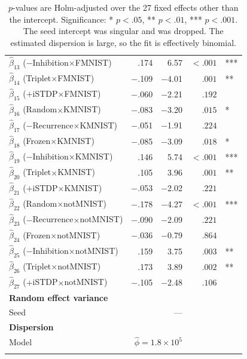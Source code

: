 {\begin{longtable}{lrrrl}
    $\hat{\beta}_{13}$ ($-$Inhibition$\times$FMNIST) & .174 & 6.57 & $<.001$ & ***\\
    $\hat{\beta}_{14}$ (Triplet$\times$FMNIST) & $-$.109 & $-$4.01 & $.001$ & **\\
    $\hat{\beta}_{15}$ ($+$iSTDP$\times$FMNIST) & $-$.060 & $-$2.21 & $.192$ & \\
    $\hat{\beta}_{16}$ (Random$\times$KMNIST) & $-$.083 & $-$3.20 & $.015$ & *\\
    $\hat{\beta}_{17}$ ($-$Recurrence$\times$KMNIST) & $-$.051 & $-$1.91 & $.224$ & \\
    $\hat{\beta}_{18}$ (Frozen$\times$KMNIST) & $-$.085 & $-$3.09 & $.018$ & *\\
    $\hat{\beta}_{19}$ ($-$Inhibition$\times$KMNIST) & .146 & 5.74 & $<.001$ & ***\\
    $\hat{\beta}_{20}$ (Triplet$\times$KMNIST) & .105 & 3.96 & $.001$ & **\\
    $\hat{\beta}_{21}$ ($+$iSTDP$\times$KMNIST) & $-$.053 & $-$2.02 & $.221$ & \\
    $\hat{\beta}_{22}$ (Random$\times$notMNIST) & $-$.178 & $-$4.27 & $<.001$ & ***\\
    $\hat{\beta}_{23}$ ($-$Recurrence$\times$notMNIST) & $-$.090 & $-$2.09 & $.221$ & \\
    $\hat{\beta}_{24}$ (Frozen$\times$notMNIST) & $-$.036 & $-$0.79 & $.864$ & \\
    $\hat{\beta}_{25}$ ($-$Inhibition$\times$notMNIST) & .159 & 3.75 & $.003$ & **\\
    $\hat{\beta}_{26}$ (Triplet$\times$notMNIST) & .173 & 3.89 & $.002$ & **\\
    $\hat{\beta}_{27}$ ($+$iSTDP$\times$notMNIST) & $-$.105 & $-$2.48 & $.106$ & \\
    \midrule
    \multicolumn{5}{l}{\textbf{Random effect variance}}\\
    Seed & \multicolumn{2}{r}{---} & &\\
    \multicolumn{5}{l}{\textbf{Dispersion}}\\
    Model & \multicolumn{2}{r}{$\hat{\phi}=1.8\times 10^{5}$} & &\\
    \bottomrule
    \caption*{$p$-values are Holm-adjusted over the 27 fixed effects other than the intercept. Significance: * $p<.05$, ** $p<.01$, *** $p<.001$. The seed intercept was singular and was dropped. The estimated dispersion is large, so the fit is effectively binomial.}
\end{longtable}
}
